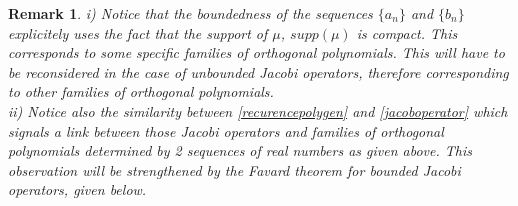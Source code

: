 \documentclass[a4paper,11pt,twoside]{article}
\numberwithin{equation}{section}
\newtheorem{remark}[Theorem]{Remark}
\theoremstyle{nonumberplain}
\newcounter{and}
\begin{document}
\begin{remark}
i) Notice that the boundedness of the sequences $\{a_n\}$ and $\{b_n\}$ explicitely uses the fact that the support of $\mu$, $supp(\mu)$ is compact. This corresponds to some specific families of orthogonal polynomials. This will have to be reconsidered in the case of unbounded Jacobi operators, therefore corresponding to other families of orthogonal polynomials.\\ ii) Notice also the similarity between \eqref{recurencepolygen} and \eqref{jacoboperator} which signals a link between those Jacobi operators and families of orthogonal polynomials determined by 2 sequences of real numbers as given above. This observation will be strengthened by the Favard theorem for bounded Jacobi operators, given below.
\end{remark}
\end{document}
